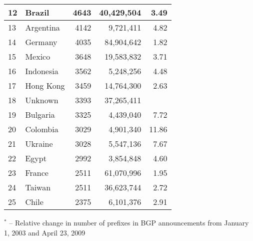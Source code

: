 \begin{table*}[p]
\begin{minipage}[t]{0.48\textwidth}
\begin{center}
\begin{tabular}{|l||l|r|r|r|}
12      &       Brazil  		&       4643    &       40,429,504      & 3.49			\tabularnewline \hline
13      &       Argentina       &       4142    &       9,721,411       & 4.82			\tabularnewline \hline
14      &       Germany 		&       4035    &       84,904,642      & 1.82			\tabularnewline \hline
15      &       Mexico  		&       3648    &       19,583,832      & 3.71			\tabularnewline \hline
16      &       Indonesia       &       3562    &       5,248,256       & 4.48			\tabularnewline \hline
17      &       Hong Kong       &       3459    &       14,764,300      & 2.63			\tabularnewline \hline
18      &       Unknown   		&       3393    &       37,265,411      & 				\tabularnewline \hline
19      &       Bulgaria        &       3325    &       4,439,040       & 7.72			\tabularnewline \hline
20      &       Colombia        &       3029    &       4,901,340       & 11.86			\tabularnewline \hline
21      &       Ukraine 		&       3028    &       5,547,136       & 7.67			\tabularnewline \hline
22      &       Egypt  			&       2992    &       3,854,848       & 4.60			\tabularnewline \hline
23      &       France 			&       2511    &       61,070,996      & 1.95			\tabularnewline \hline
24      &       Taiwan 			&       2511    &       36,623,744      & 2.72			\tabularnewline \hline
25      &       Chile  			&       2375    &       6,101,376       & 2.91			\tabularnewline \hline
	\end{tabular}
	\end{center}
	
	\small	$^{*}$ -- Relative change in number of prefixes in BGP announcements from January 1, 2003 and April 23, 2009
\end{minipage}

\vspace{1cm}


\end{table*}
